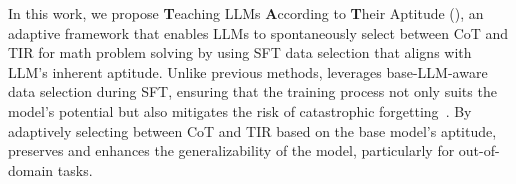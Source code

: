 


In this work, we propose \textbf{T}eaching LLMs \textbf{A}ccording to \textbf{T}heir Aptitude (\textbf{\method}), an adaptive framework that enables LLMs to spontaneously select between CoT and TIR for math problem solving by using SFT data selection that aligns with LLM's inherent aptitude.
Unlike previous methods, {\method} leverages base-LLM-aware data selection during SFT, ensuring that the training process not only suits the model's potential but also mitigates the risk of catastrophic forgetting~\citep{chu2025sftrl}. 
By adaptively selecting between CoT and TIR based on the base model's aptitude, {\method} preserves and enhances the generalizability of the model, particularly for out-of-domain tasks. 

